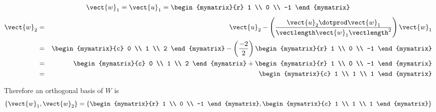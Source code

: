 \begin{solution}
\[
\vect{w}_1 = \vect{u}_1 = \begin{mymatrix}{r}
1 \\
0 \\
-1
\end{mymatrix}
\]
\begin{eqnarray*}
\vect{w}_2 &=& \vect{u}_2 - \left(  \frac{ \vect{u}_2 \dotprod \vect{w}_1}{\vectlength \vect{w}_1 \vectlength^2} \right)  \vect{w}_1\\
&=& \begin{mymatrix}{c}
0 \\
1 \\
2
\end{mymatrix}
-
\left(
\frac{-2}{2}\right)
\begin{mymatrix}{r}
1 \\
0 \\
-1
\end{mymatrix}
\\
&=&
\begin{mymatrix}{c}
0 \\
1 \\
2
\end{mymatrix} 
+
\begin{mymatrix}{r}
1 \\
0 \\
-1
\end{mymatrix} \\
&=&
\begin{mymatrix}{c}
1 \\
1 \\
1
\end{mymatrix}
\end{eqnarray*}

Therefore an orthogonal basis of $W$ is 
\[
\left\{ \vect{w}_1, \vect{w}_2 \right\} = 
\left\{
\begin{mymatrix}{r}
1 \\
0 \\
-1
\end{mymatrix}, 
\begin{mymatrix}{c}
1 \\
1 \\
1
\end{mymatrix}
\right\}
\]


\end{solution}

